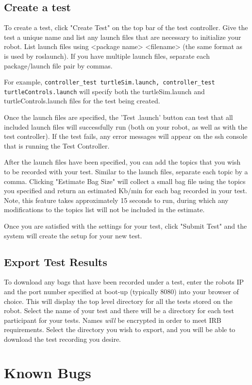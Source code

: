 \documentclass[onecolumn, draftclsnofoot,10pt, compsoc]{report}
\begin{document}
\subsection{Create a test}
To create a test, click "Create Test" on the top bar of the test controller. Give the test a unique name and list any launch files that are necessary to initialize your robot. List launch files using <package name> <filename> (the same format as is used by roslaunch). If you have multiple launch files, separate each package/launch file pair by commas. 

For example, \texttt{controller\_test turtleSim.launch, controller\_test turtleControls.launch} will specify both the turtleSim.launch and turtleControls.launch files for the test being created.

Once the launch files are specified, the 'Test .launch' button can test that all included launch files will successfully run (both on your robot, as well as with the test controller). If the test fails, any error messages will appear on the ssh console that is running the Test Controller. 

After the launch files have been specified, you can add the topics that you wish to be recorded with your test. Similar to the launch files, separate each topic by a comma. Clicking "Estimate Bag Size" will collect a small bag file using the topics you specified and return an estimated Kb/min for each bag recorded in your test. Note, this feature takes approximately 15 seconds to run, during which any modifications to the topics list will not be included in the estimate. 

Once you are satisfied with the settings for your test, click "Submit Test" and the system will create the setup for your new test. 

\subsection{Export Test Results}
To download any bags that have been recorded under a test, enter the robots IP and the port number specified at boot-up (typically 8080) into your browser of choice. This will display the top level directory for all the tests stored on the robot. Select the name of your test and there will be a directory for each test participant for your tests. Names \textit{will} be encrypted in order to meet IRB requirements. Select the directory you wish to export, and you will be able to download the test recording you desire.

\section{Known Bugs}
\end{document}
